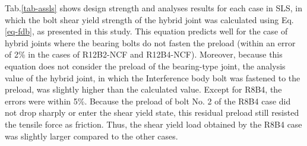 Tab.\ref{tab-assls} shows design strength and analyses results for each case in SLS, in which the bolt shear yield strength of the hybrid joint was calculated using Eq.\ref{eq-fdb}, as presented in this study. This equation predicts well for the case of hybrid joints where the bearing bolts do not fasten the preload (within an error of 2\% in the cases of R12B2-NCF and R12B4-NCF). Moreover, because this equation does not consider the preload of the bearing-type joint, the analysis value of the hybrid joint, in which the Interference body bolt was fastened to the preload, was slightly higher than the calculated value. Except for R8B4, the errors were within 5\%. Because the preload of bolt No. 2 of the R8B4 case did not drop sharply or enter the shear yield state, this residual preload still resisted the tensile force as friction. Thus, the shear yield load obtained by the R8B4 case was slightly larger compared to the other cases.

